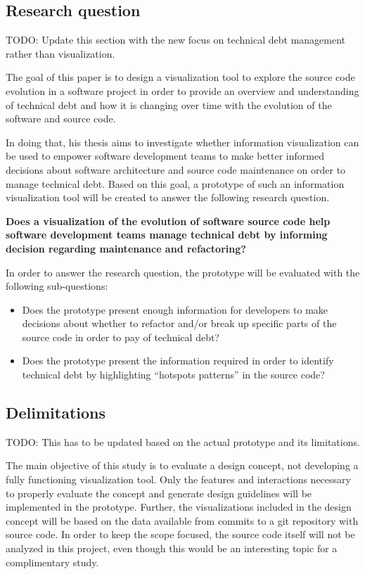 \subsection{Research question}

TODO: Update this section with the new focus on technical debt management rather than visualization.

The goal of this paper is to design a visualization tool to explore the source code evolution in a software project in order to provide an overview and understanding of technical debt and how it is changing over time with the evolution of the software and source code. 

In doing that, his thesis aims to investigate whether information visualization can be used to empower software development teams to make better informed decisions about software architecture and source code maintenance on order to manage technical debt. Based on this goal, a prototype of such an information visualization tool will be created to answer the following research question.


\smallskip
\textbf{
Does a visualization of the evolution of software source code help software development teams manage technical debt by informing decision regarding maintenance and refactoring?
}
\smallskip

In order to answer the research question, the prototype will be evaluated with the following sub-questions:
\begin{itemize}
\item Does the prototype present enough information for developers to make decisions about whether to refactor and/or break up specific parts of the source code in order to pay of technical debt?
\item Does the prototype present the information required in order to identify technical debt by highlighting “hotspots patterns” \cite{mo_hotspot_2015} in the source code?
\end{itemize}

\subsection{Delimitations}

TODO: This has to be updated based on the actual prototype and its limitations.

The main objective of this study is to evaluate a design concept, not developing a fully functioning visualization tool. Only the features and interactions necessary to properly evaluate the concept and generate design guidelines will be implemented in the prototype. Further, the visualizations included in the design concept will be based on the data available from commits to a git repository with source code. In order to keep the scope focused, the source code itself will not be analyzed in this project, even though this would be an interesting topic for a complimentary study.
